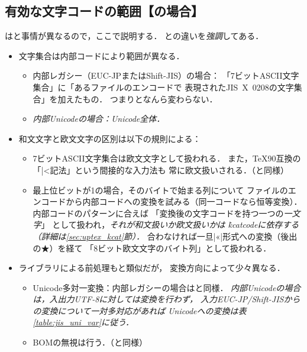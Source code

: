 \documentclass[a4paper,11pt,nomag,dvipdfmx]{jsarticle}
\begin{document}
\subsection{有効な文字コードの範囲【\upTeX の場合】}\label{sec:uptex_code}
\upTeX は\pTeX と事情が異なるので，ここで説明する．
\pTeX との違いを\emph{強調}してある．
\begin{itemize}
  \item 文字集合は内部コードにより範囲が異なる．
    \begin{itemize}
      \item 内部レガシー（EUC-JPまたはShift-JIS）の場合：
        「7ビットASCII文字集合」に「あるファイルのエンコードで
        表現されたJIS~X~0208の文字集合」を加えたもの．
        つまり\pTeX となんら変わらない．
      \item \emph{内部Unicodeの場合：Unicode全体．}
    \end{itemize}
  \item 和文文字と欧文文字の区別は以下の規則による：
%
\begin{itemize}
 \item 7ビットASCII文字集合は欧文文字として扱われる．
    また，\TeX90互換の「|^^|記法」という間接的な入力法も
    常に欧文扱いされる．（\pTeX と同様）
 \item 最上位ビットが1の場合，そのバイトで始まる列について
    ファイルのエンコードから内部コードへの変換を試みる（同一コードなら恒等変換）．
    内部コードのパターンに合えば
    「変換後の文字コードを持つ一つの\emph{一文字}」
    として扱われ，\emph{それが和文扱いか欧文扱いかは
    \.{kcatcode}に依存する（詳細は\ref{sec:uptex_kcat}節）．}
    合わなければ一旦|^^ab|形式への変換（後出の★）を経て
    「8ビット欧文文字のバイト列」として扱われる．
\end{itemize}
%
 \item {}ライブラリによる前処理も\pTeX と類似だが，
   変換方向によって少々異なる．
%
\begin{itemize}
 \item Unicode多対一変換：内部レガシーの場合は\pTeX と同様．
  \emph{内部Unicodeの場合は，入出力UTF-8に対しては変換を行わず，
  入力EUC-JP/Shift-JISからの変換について一対多対応があれば
  Unicodeへの変換は表\ref{table:jis_uni_var}に従う．}
 \item BOMの無視は行う．（\pTeX と同様）

\end{itemize}
\end{itemize}
\end{document}
